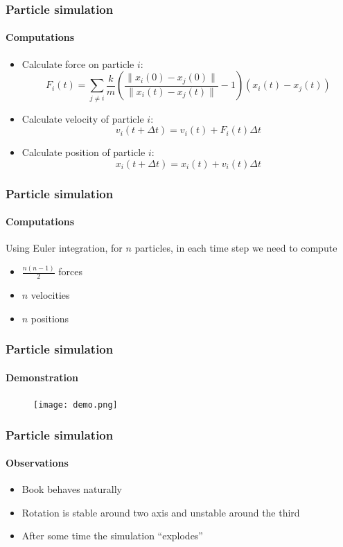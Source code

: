 \documentclass{beamer}
\begin{document}
\begin{frame}
 \frametitle{Particle simulation}
 \framesubtitle{Computations}
 \begin{itemize}
  \item Calculate force on particle $i$:
  \begin{displaymath}
   F_i(t) = \sum_{j \neq i} \frac{k}{m} \left( \frac{\|x_i(0) - x_j(0)\|}{\|x_i(t) - x_j(t)\|} - 1\right) \left(x_i(t) - x_j(t)\right)
  \end{displaymath}
  \item Calculate velocity of particle $i$:
  \begin{displaymath}
   v_i(t + \Delta t) = v_i(t) + F_i(t) \Delta t
  \end{displaymath}
  \item Calculate position of particle $i$:
  \begin{displaymath}
   x_i(t + \Delta t) = x_i(t) + v_i(t) \Delta t
  \end{displaymath}
 \end{itemize}
\end{frame}

\begin{frame}
 \frametitle{Particle simulation}
 \framesubtitle{Computations}
 Using Euler integration, for $n$ particles, in each time step we need to compute
 \begin{itemize}
  \item $\frac{n(n-1)}{2}$ forces
  \item $n$ velocities
  \item $n$ positions
 \end{itemize}
\end{frame}

\begin{frame}
 \frametitle{Particle simulation}
 \framesubtitle{Demonstration}
 \begin{figure}
  \centering
  \texttt{[image: demo.png]}
 \end{figure}
\end{frame}

\begin{frame}
 \frametitle{Particle simulation}
 \framesubtitle{Observations}
 \begin{itemize}
  \item Book behaves naturally
  \item Rotation is stable around two axis and unstable around the third
  \item After some time the simulation ``explodes''
 \end{itemize}
\end{frame}
\end{document}
